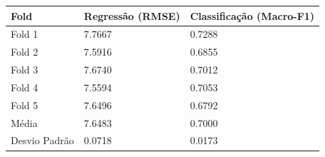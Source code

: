 \begin{tabular}{lll}
\toprule
Fold & Regressão (RMSE) & Classificação (Macro-F1) \\
\midrule
Fold 1 & 7.7667 & 0.7288 \\
Fold 2 & 7.5916 & 0.6855 \\
Fold 3 & 7.6740 & 0.7012 \\
Fold 4 & 7.5594 & 0.7053 \\
Fold 5 & 7.6496 & 0.6792 \\
Média & 7.6483 & 0.7000 \\
Desvio Padrão & 0.0718 & 0.0173 \\
\bottomrule
\end{tabular}
